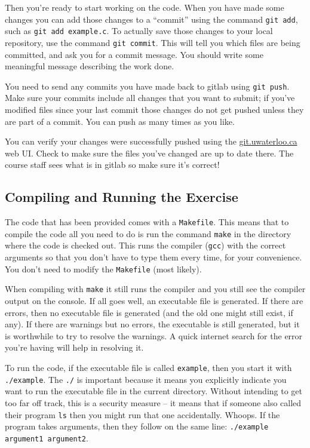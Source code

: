 Then you're ready to start working on the code. When you have made some changes you can add those changes to a ``commit'' using the command \texttt{git add}, such as \texttt{git add example.c}. To actually save those changes to your local repository, use the command \texttt{git commit}. This will tell you which files are being committed, and ask you for a commit message. You should write some meaningful message describing the work done.

You need to send any commits you have made back to gitlab using \texttt{git push}. Make sure your commits include all changes that you want to submit; if you've modified files since your last commit those changes do not get pushed unless they are part of a commit. You can push as many times as you like.

You can verify your changes were successfully pushed using the \url{git.uwaterloo.ca} web UI. Check to make sure the files you've changed are up to date there. The course staff sees what is in gitlab so make sure it's correct!

\subsection*{Compiling and Running the Exercise}

The code that has been provided comes with a \texttt{Makefile}. This means that to compile the code all you need to do is run the command \texttt{make} in the directory where the code is checked out. This runs the compiler (\texttt{gcc}) with the correct arguments so that you don't have to type them every time, for your convenience. You don't need to modify the \texttt{Makefile} (most likely).

When compiling with \texttt{make} it still runs the compiler and you still see the compiler output on the console. If all goes well, an executable file is generated. If there are errors, then no executable file is generated (and the old one might still exist, if any). If there are warnings but no errors, the executable is still generated, but it is worthwhile to try to resolve the warnings. A quick internet search for the error you're having will help in resolving it.

To run the code, if the executable file is called \texttt{example}, then you start it with \texttt{./example}. The \texttt{./} is important because it means you explicitly indicate you want to run the executable file in the current directory. Without intending to get too far off track, this is a security measure -- it means that if someone also called their program  \texttt{ls} then you might run that one accidentally. Whoops. If the program takes arguments, then they follow on the same line: \texttt{./example argument1 argument2}.



